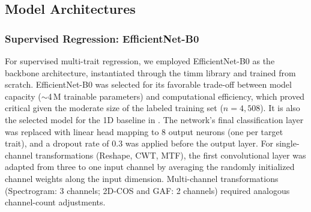\subsection{Model Architectures}
\label{sec:models}



\subsubsection{Supervised Regression: EfficientNet-B0}
\label{sec:efficientnet}

For supervised multi-trait regression, we employed EfficientNet-B0 \citep{tan2019efficientnet} as the backbone architecture, instantiated through the timm library \citep{rw2019timm} and trained from scratch. EfficientNet-B0 was selected for its favorable trade-off between model capacity ($\sim$4\,M trainable parameters) and computational efficiency, which proved critical given the moderate size of the labeled training set ($n = 4{,}508$). It is also the selected model for the 1D baseline in \citet{cherif2025greenhyperspectra}. 
 The network's final classification layer was replaced with  linear head mapping to 8 output neurons (one per target trait), and a dropout rate of 0.3 was applied before the output layer. For single-channel transformations (Reshape, CWT, MTF), the first convolutional layer was adapted from three to one input channel by averaging the randomly initialized channel weights along the input dimension. Multi-channel transformations (Spectrogram: 3 channels; 2D-COS and GAF: 2 channels) required analogous channel-count adjustments.

